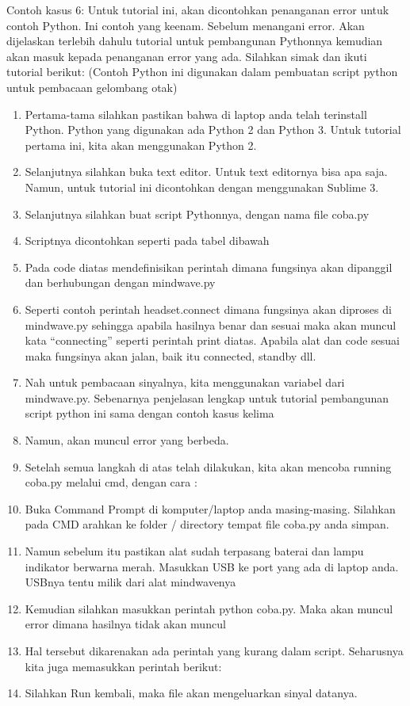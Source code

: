Contoh kasus 6: Untuk tutorial ini, akan dicontohkan penanganan error untuk contoh Python. Ini contoh yang keenam. Sebelum menangani error. Akan dijelaskan terlebih dahulu tutorial untuk pembangunan Pythonnya kemudian akan masuk kepada penanganan error yang ada. Silahkan simak dan ikuti tutorial berikut: 
(Contoh Python ini digunakan dalam pembuatan script python untuk pembacaan gelombang otak)
\begin{enumerate}
\item Pertama-tama silahkan pastikan bahwa di laptop anda telah terinstall Python. Python yang digunakan ada Python 2 dan Python 3. Untuk tutorial pertama ini, kita akan menggunakan Python 2.
\item Selanjutnya silahkan buka text editor. Untuk text editornya bisa apa saja. Namun, untuk tutorial ini dicontohkan dengan menggunakan Sublime 3.
\item Selanjutnya silahkan buat script Pythonnya, dengan nama file coba.py
\item Scriptnya dicontohkan seperti pada tabel dibawah 
\item Pada code diatas mendefinisikan perintah dimana fungsinya akan dipanggil dan berhubungan dengan mindwave.py
\item Seperti contoh perintah headset.connect dimana fungsinya akan diproses di mindwave.py sehingga apabila hasilnya benar dan sesuai maka akan muncul kata “connecting” seperti perintah print diatas. Apabila alat dan code sesuai maka fungsinya akan jalan, baik itu connected, standby dll. 
\item Nah untuk pembacaan sinyalnya, kita menggunakan variabel dari mindwave.py. Sebenarnya penjelasan lengkap untuk tutorial pembangunan script python ini sama dengan contoh kasus kelima
\item Namun, akan muncul error yang berbeda.
\item Setelah semua langkah di atas telah dilakukan, kita akan mencoba running coba.py melalui cmd, dengan cara :
\item Buka Command Prompt di komputer/laptop anda masing-masing. Silahkan pada CMD arahkan ke folder / directory tempat file coba.py anda simpan.
\item Namun sebelum itu pastikan alat sudah terpasang baterai dan lampu indikator berwarna merah. Masukkan USB ke port yang ada di laptop anda. USBnya tentu milik dari alat mindwavenya
\item Kemudian silahkan masukkan perintah python coba.py. Maka akan muncul error dimana hasilnya tidak akan muncul
\item Hal tersebut dikarenakan ada perintah yang kurang dalam script. Seharusnya kita juga memasukkan perintah berikut:
\item Silahkan Run kembali, maka file akan mengeluarkan sinyal datanya.
\end{enumerate}